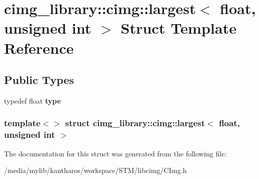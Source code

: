 \hypertarget{structcimg__library_1_1cimg_1_1largest_3_01float_00_01unsigned_01int_01_4}{
\section{cimg\_\-library::cimg::largest$<$ float, unsigned int $>$ Struct Template Reference}
\label{structcimg__library_1_1cimg_1_1largest_3_01float_00_01unsigned_01int_01_4}
}
\subsection*{Public Types}
\begin{DoxyCompactItemize}
\item 
\hypertarget{structcimg__library_1_1cimg_1_1largest_3_01float_00_01unsigned_01int_01_4_a18c24008607358fdee14947e4c182daf}{
typedef float {\bfseries type}}
\label{structcimg__library_1_1cimg_1_1largest_3_01float_00_01unsigned_01int_01_4_a18c24008607358fdee14947e4c182daf}

\end{DoxyCompactItemize}
\subsubsection*{template$<$$>$ struct cimg\_\-library::cimg::largest$<$ float, unsigned int $>$}



The documentation for this struct was generated from the following file:\begin{DoxyCompactItemize}
\item 
/media/mylib/kantharos/workspace/STM/libcimg/CImg.h\end{DoxyCompactItemize}
